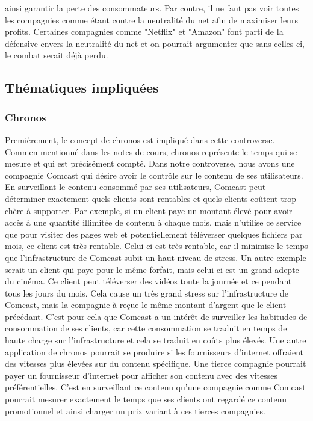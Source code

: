 \documentclass[12pt]{article}
\begin{document}
ainsi garantir la perte des consommateurs. Par contre, il ne faut pas voir toutes les compagnies comme étant contre la neutralité du net afin de maximiser leurs profits. Certaines compagnies comme "Netflix" et "Amazon" font parti de la défensive envers la neutralité du net et on pourrait argumenter que sans celles-ci, le combat serait déjà perdu.

\subsection{Thématiques impliquées}
\subsubsection{Chronos}
Premièrement, le concept de chronos est impliqué dans cette controverse. Commen mentionné dans les notes de cours, chronos représente le temps qui se mesure et qui est précisément compté. Dans notre controverse, nous avons une compagnie Comcast qui désire avoir le contrôle sur le contenu de ses utilisateurs. En surveillant le contenu consommé par ses utilisateurs, Comcast peut déterminer exactement quels clients sont rentables et quels clients coûtent trop chère à supporter. Par exemple, si un client paye un montant élevé pour avoir accès à une quantité illimitée de contenu à chaque mois, mais n'utilise ce service que pour visiter des pages web et potentiellement téléverser quelques fichiers par mois, ce client est très rentable. Celui-ci est très rentable, car il minimise le temps que l'infrastructure de Comcast subit un haut niveau de stress. Un autre exemple serait un client qui paye pour le même forfait, mais celui-ci est un grand adepte du cinéma. Ce client peut téléverser des vidéos toute la journée et ce pendant tous les jours du mois. Cela cause un très grand stress sur l'infrastructure de Comcast, mais la compagnie à reçue le même montant d'argent que le client précédant. C'est pour cela que Comcast a un intérêt de surveiller les habitudes de consommation de ses clients, car cette consommation se traduit en temps de haute charge sur l'infrastructure et cela se traduit en coûts plus élevés. Une autre application de chronos pourrait se produire si les fournisseurs d'internet offraient des vitesses plus élevées sur du contenu spécifique. Une tierce compagnie pourrait payer un fournisseur d'internet pour afficher son contenu avec des vitesses préférentielles. C'est en surveillant ce contenu qu'une compagnie comme Comcast pourrait mesurer exactement le temps que ses clients ont regardé ce contenu promotionnel et ainsi charger un prix variant à ces tierces compagnies.
\end{document}
